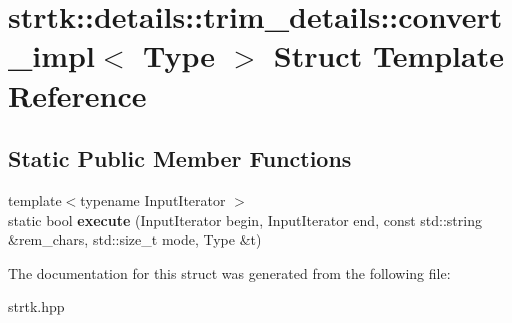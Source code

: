 \hypertarget{structstrtk_1_1details_1_1trim__details_1_1convert__impl}{\section{strtk\-:\-:details\-:\-:trim\-\_\-details\-:\-:convert\-\_\-impl$<$ Type $>$ Struct Template Reference}
\label{structstrtk_1_1details_1_1trim__details_1_1convert__impl}
}
\subsection*{Static Public Member Functions}
\begin{DoxyCompactItemize}
\item 
\hypertarget{structstrtk_1_1details_1_1trim__details_1_1convert__impl_a9614e3810124241c8db91f6af54335a2}{{\footnotesize template$<$typename Input\-Iterator $>$ }\\static bool {\bfseries execute} (Input\-Iterator begin, Input\-Iterator end, const std\-::string \&rem\-\_\-chars, std\-::size\-\_\-t mode, Type \&t)}\label{structstrtk_1_1details_1_1trim__details_1_1convert__impl_a9614e3810124241c8db91f6af54335a2}

\end{DoxyCompactItemize}


The documentation for this struct was generated from the following file\-:\begin{DoxyCompactItemize}
\item 
strtk.\-hpp\end{DoxyCompactItemize}
